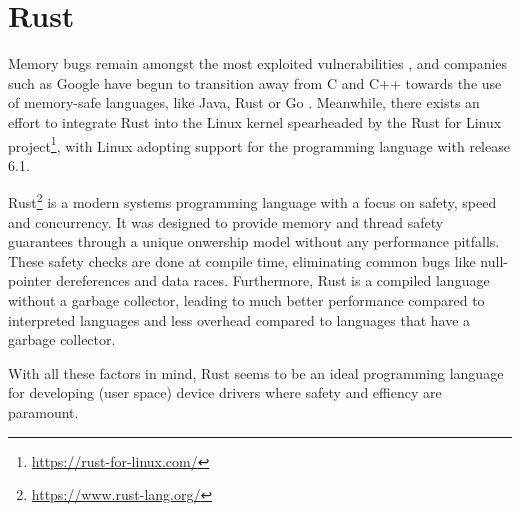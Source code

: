 \section{Rust}
Memory bugs remain amongst the most exploited vulnerabilities \cite{mitre}, and companies such as Google have begun to transition away from C and C++ towards the use of memory-safe languages, like Java, Rust or Go \cite{google}. Meanwhile, there exists an effort to integrate Rust into the Linux kernel spearheaded by the Rust for Linux project\footnote{\url{https://rust-for-linux.com/}}, with Linux adopting support for the programming language with release 6.1.

Rust\footnote{\url{https://www.rust-lang.org/}} is a modern systems programming language with a focus on safety, speed and concurrency. It was designed to provide memory and thread safety guarantees through a unique onwership model without any performance pitfalls. These safety checks are done at compile time, eliminating common bugs like null-pointer dereferences and data races. Furthermore, Rust is a compiled language without a garbage collector, leading to much better performance compared to interpreted languages and less overhead compared to languages that have a garbage collector.

With all these factors in mind, Rust seems to be an ideal programming language for developing (user space) device drivers where safety and effiency are paramount.


